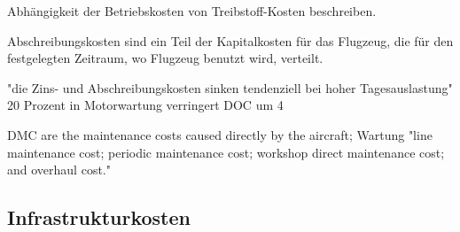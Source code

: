 Abhängigkeit der Betriebskosten von Treibstoff-Kosten beschreiben.


Abschreibungskosten sind ein Teil der Kapitalkosten für das Flugzeug, die für den festgelegten Zeitraum, wo Flugzeug benutzt wird, verteilt.


"die Zins- und Abschreibungskosten sinken tendenziell bei hoher Tagesauslastung"
20 Prozent in Motorwartung verringert DOC um 4%


DMC are the maintenance costs caused directly by the aircraft; 
Wartung "line maintenance cost;
periodic maintenance cost;
workshop direct maintenance cost; and
overhaul cost."

\subsection{Infrastrukturkosten}
